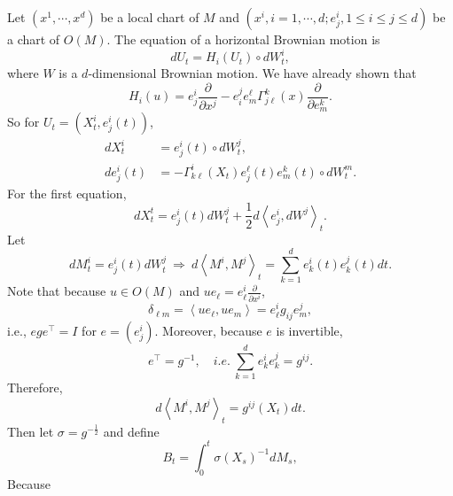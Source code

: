 \begin{exam}
    Let $(x^1,\cdots, x^d)$ be a local chart of $M$ and $(x^i,i=1,\cdots,d;e^i_j,1\leq i \leq j \leq d)$ be a chart of $O(M)$. The equation of a horizontal Brownian motion is
    \begin{equation*}
        dU_t = H_i(U_t) \circ dW^i_t,
    \end{equation*}
    where $W$ is a $d$-dimensional Brownian motion. We have already shown that
    \begin{equation*}
        H_i(u) = e^i_j\frac{\partial}{\partial x^j} - e^j_ie^\ell_m\Gamma^k_{j\ell}(x)\frac{\partial}{\partial e^k_m}.
    \end{equation*}
    So for $U_t = (X_t^i,e^i_j(t))$,
    \begin{align*}
        dX^i_t &= e^i_j(t) \circ dW^j_t, \\
        de^i_j(t) &= - \Gamma^i_{k\ell}(X_t) e^\ell_j(t)e^k_m(t) \circ dW^m_t.
    \end{align*}
    For the first equation,
    \begin{equation*}
        d X_t^t=e_j^i(t) d W_t^j+\frac{1}{2} d\left\langle e_j^i, d W^j\right\rangle_t.
    \end{equation*}
    Let
    \begin{equation*}
        dM^i_t = e^i_j(t)dW^j_t~\Rightarrow~d\left\langle M^i, M^j\right\rangle_t=\sum_{k=1}^d e_k^i(t) e_k^j(t) d t.
    \end{equation*}
    Note that because $u \in O(M)$ and $ue_\ell = e^i_\ell \frac{\partial}{\partial x^i}$,
    \begin{equation*}
        \delta_{\ell m}=\left\langle u e_\ell, u e_m\right\rangle=e_\ell^i g_{i j} e_m^j,
    \end{equation*}
    i.e., $ege^\top =I$ for $e = (e^i_j)$. Moreover, because $e$ is invertible,
    \begin{equation*}
        e^\top = g^{-1},\quad i.e.~ \sum_{k=1}^de^i_ke^j_k = g^{ij}.
    \end{equation*}
    Therefore,
    \begin{equation*}
        d\left\langle M^i, M^j\right\rangle_t=g^{i j}\left(X_t\right) d t .
    \end{equation*}
    Then let $\sigma = g^{-\frac{1}{2}}$ and define
    \begin{equation*}
        B_t=\int_0^t \sigma\left(X_s\right)^{-1} d M_s,
    \end{equation*}
    Because
    \begin{equation*}

\end{equation*}
\end{exam}
